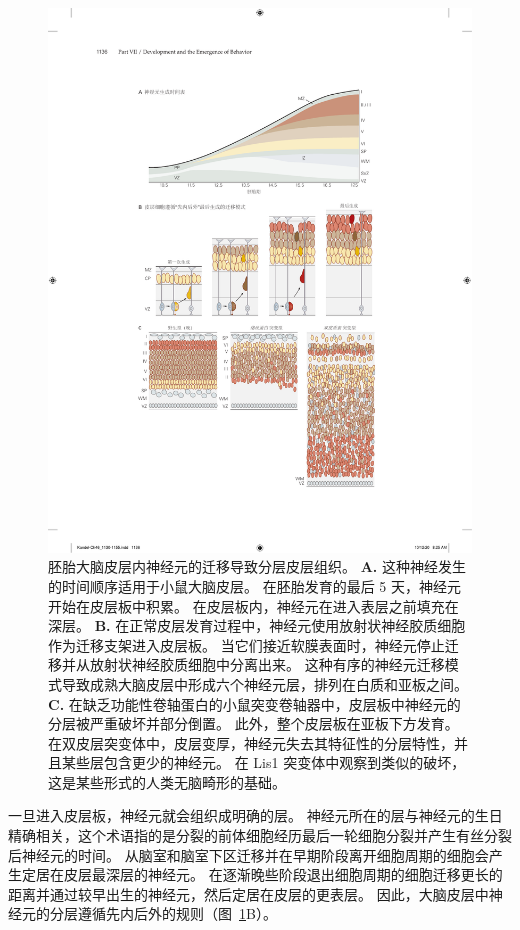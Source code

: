 \begin{figure}[htbp]
	\centering
	\includegraphics[width=0.79\linewidth]{chap46/fig_46_5}
	\caption{胚胎大脑皮层内神经元的迁移导致分层皮层组织\cite{olson2002smooth}。
		\textbf{A.} 这种神经发生的时间顺序适用于小鼠大脑皮层。
		在胚胎发育的最后 5 天，神经元开始在皮层板中积累。
		在皮层板内，神经元在进入表层之前填充在深层。 
		\textbf{B.} 在正常皮层发育过程中，神经元使用放射状神经胶质细胞作为迁移支架进入皮层板。
		当它们接近软膜表面时，神经元停止迁移并从放射状神经胶质细胞中分离出来。
		这种有序的神经元迁移模式导致成熟大脑皮层中形成六个神经元层，排列在白质和亚板之间。
		\textbf{C.} 在缺乏功能性卷轴蛋白的小鼠突变卷轴器中，皮层板中神经元的分层被严重破坏并部分倒置。
		此外，整个皮层板在亚板下方发育。
		在双皮层突变体中，皮层变厚，神经元失去其特征性的分层特性，并且某些层包含更少的神经元。
		在 Lis1 突变体中观察到类似的破坏，这是某些形式的人类无脑畸形的基础。}
	\label{fig:46_5}
\end{figure}


一旦进入皮层板，神经元就会组织成明确的层。
神经元所在的层与神经元的生日精确相关，这个术语指的是分裂的前体细胞经历最后一轮细胞分裂并产生有丝分裂后神经元的时间。
从脑室和脑室下区迁移并在早期阶段离开细胞周期的细胞会产生定居在皮层最深层的神经元。
在逐渐晚些阶段退出细胞周期的细胞迁移更长的距离并通过较早出生的神经元，然后定居在皮层的更表层。
因此，大脑皮层中神经元的分层遵循先内后外的规则（图~\ref{fig:46_5}B）。



